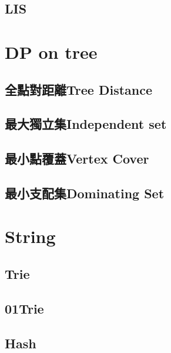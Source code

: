 \subsection{LIS}


\section{DP on tree}

\subsection{全點對距離Tree Distance}


\newpage

\subsection{最大獨立集Independent set}


\subsection{最小點覆蓋Vertex Cover}


\subsection{最小支配集Dominating Set}




\clearpage

\section{String}

\subsection{Trie}


\subsection{01Trie}


\subsection{Hash}


